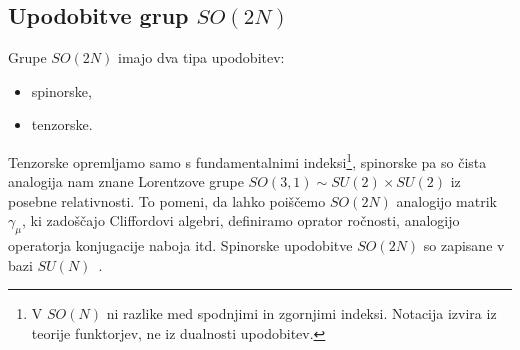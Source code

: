 \subsection{Upodobitve grup $SO(2N)$}

Grupe $SO(2N)$ imajo dva tipa upodobitev:
\begin{itemize}
	\item{spinorske,}
	\item{tenzorske.}
\end{itemize}
Tenzorske opremljamo samo s fundamentalnimi indeksi\footnote{V $SO(N)$ ni razlike med spodnjimi in
zgornjimi indeksi. Notacija izvira iz teorije funktorjev, ne iz dualnosti upodobitev.}, spinorske
pa so čista analogija nam znane Lorentzove grupe $SO(3,1) \sim SU(2)\times SU(2)$ iz posebne
relativnosti. To pomeni, da lahko poiščemo $SO(2N)$ analogijo matrik $\gamma_\mu$, ki zadoščajo
Cliffordovi algebri, definiramo oprator ročnosti, analogijo operatorja konjugacije naboja itd.
Spinorske upodobitve $SO(2N)$ so zapisane v bazi $SU(N)$~\cite{mohapatra}.

